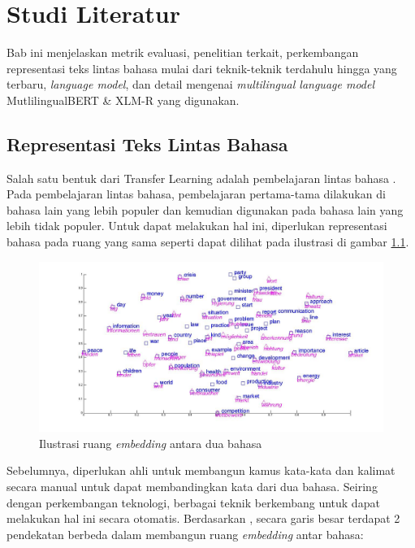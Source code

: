 \chapter{Studi Literatur}

Bab ini menjelaskan metrik evaluasi, penelitian terkait, perkembangan representasi teks lintas bahasa mulai dari teknik-teknik terdahulu hingga yang terbaru, \textit{language model}, dan detail mengenai \textit{multilingual language model} MutlilingualBERT \& XLM-R yang digunakan. 

\section{Representasi Teks Lintas Bahasa}
    Salah satu bentuk dari Transfer Learning adalah pembelajaran lintas bahasa \parencite{ruder2019transfer}. Pada pembelajaran lintas bahasa, pembelajaran pertama-tama dilakukan di bahasa lain yang lebih populer dan kemudian digunakan pada bahasa lain yang lebih tidak populer. Untuk dapat melakukan hal ini, diperlukan representasi bahasa pada ruang yang sama seperti dapat dilihat pada ilustrasi di gambar \ref{fig:ilustrasi_embedding}.

    \begin{figure}[ht]
        \centering
        \includegraphics[width=1\textwidth]{resources/luong_et_al_2015.jpg}
        \caption{Ilustrasi ruang \textit{embedding} antara dua bahasa \parencite{Luong_Pham_Manning_2015}} 
        \label{fig:ilustrasi_embedding}
    \end{figure}

    Sebelumnya, diperlukan ahli untuk membangun kamus kata-kata dan kalimat secara manual untuk dapat membandingkan kata dari dua bahasa. Seiring dengan perkembangan teknologi, berbagai teknik berkembang untuk dapat melakukan hal ini secara otomatis. Berdasarkan \parencite{Wang_Xie_Xu_Yang_Neubig_Carbonell_2019}, secara garis besar terdapat 2 pendekatan berbeda dalam membangun ruang \textit{embedding} antar bahasa:

